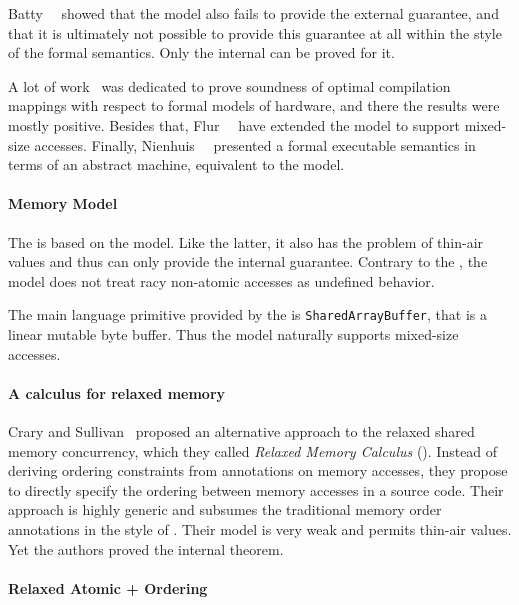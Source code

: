 Batty~\etal~\cite{Batty-al:ESOP15} showed that 
the model also fails to provide the external \DRF guarantee, 
and that it is ultimately not possible to provide this guarantee
at all within the style of the \CMM formal semantics.
Only the internal \DRF can be proved for it. 

A lot of work~\cite{Batty-al:POPL11, Sarkar-al:PLDI12, Batty-al:POPL12, Batty-al:POPL16} 
was dedicated to prove soundness of optimal compilation mappings 
with respect to formal models of hardware, 
and there the results were mostly positive.
Besides that, Flur~\etal~\cite{Flur-al:POPL17} have extended 
the model to support mixed-size accesses.
Finally, Nienhuis~\etal~\cite{Nienhuis-al:OOPSLA16} presented 
a formal executable semantics in terms of an abstract machine, 
equivalent to the \CMM model. 

\paragraph{\JS Memory Model}

The \JSMM is based on the \CMM model. 
Like the latter, it also has the problem of thin-air values
and thus can only provide the internal \DRF guarantee. 
Contrary to the \CMM, the \JS model does not treat 
racy non-atomic accesses as undefined behavior. 

The main language primitive provided by the \JSMM
is \texttt{SharedArrayBuffer}, that is a linear mutable byte buffer.
Thus the model naturally supports mixed-size accesses.

\paragraph{A calculus for relaxed memory}

Crary and Sullivan~\cite{Crary-Sullivan:POPL15} proposed 
an alternative approach to the relaxed shared memory concurrency,
which they called \emph{Relaxed Memory Calculus} (\RMC).
Instead of deriving ordering constraints from annotations 
on memory accesses, they propose to directly specify 
the ordering between memory accesses in a source code. 
Their approach is highly generic and subsumes 
the traditional memory order annotations in the style of \CMM.
Their model is very weak and permits thin-air values. 
Yet the authors proved the internal \DRF theorem.

\paragraph{Relaxed Atomic + Ordering}

